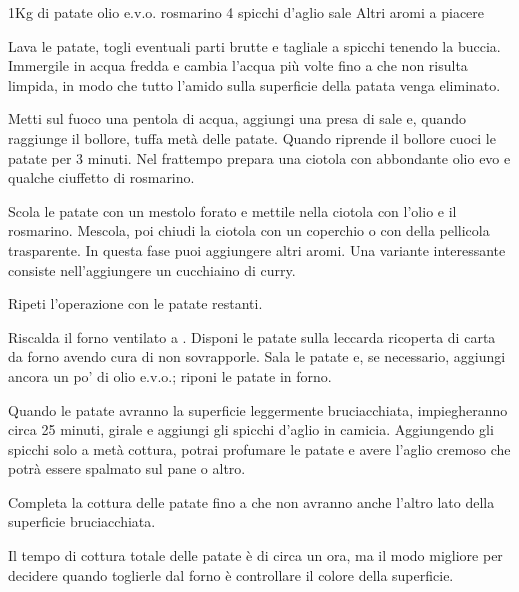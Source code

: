 \begin{ingreds}
1Kg di patate
olio e.v.o.
rosmarino
4 spicchi d'aglio
sale
Altri aromi a piacere



\end{ingreds}

\begin{method}
Lava le patate, togli eventuali parti brutte e tagliale a spicchi tenendo la buccia. Immergile in acqua fredda e cambia l'acqua più volte fino a che non risulta limpida, in modo che tutto l'amido sulla superficie della patata venga eliminato.

Metti sul fuoco una pentola di acqua, aggiungi una presa di sale e, quando raggiunge il bollore, tuffa metà delle patate. Quando riprende il bollore cuoci le patate per 3 minuti. Nel frattempo prepara una ciotola con abbondante olio evo e qualche ciuffetto di rosmarino.

Scola le patate con un mestolo forato e mettile nella ciotola con l'olio e il rosmarino. Mescola, poi chiudi la ciotola con un coperchio o con della pellicola trasparente. In questa fase puoi aggiungere altri aromi. Una variante interessante consiste nell'aggiungere un cucchiaino di curry.

Ripeti l'operazione con le patate restanti.

Riscalda il forno ventilato a . Disponi le patate sulla leccarda ricoperta di carta da forno avendo cura di non sovrapporle. Sala le patate e, se necessario, aggiungi ancora un po' di olio e.v.o.; riponi le patate in forno.

Quando le patate avranno la superficie leggermente bruciacchiata, impiegheranno circa 25 minuti, girale e aggiungi gli spicchi d'aglio in camicia. Aggiungendo gli spicchi solo a metà cottura, potrai profumare le patate e avere l'aglio cremoso che potrà essere spalmato sul pane o altro.

Completa la cottura delle patate fino a che non avranno anche l'altro lato della superficie bruciacchiata.

Il tempo di cottura totale delle patate è di circa un ora, ma il modo migliore per decidere quando toglierle dal forno è controllare il colore della superficie.


\end{method}
